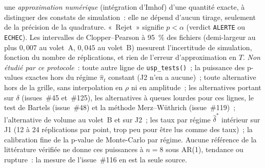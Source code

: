 \documentclass[a4paper,11pt]{article}
\newcommand{\code}[1]{\texttt{\small #1}}
\begin{document}
une \emph{approximation numérique} (intégration d'Imhof) d'une quantité exacte, à distinguer des
constats de simulation~: elle ne dépend d'aucun tirage, seulement de la précision de la
quadrature. «~Rejet~» signifie $p < \alpha$ (verdict \code{ALERTE} ou \code{ECHEC}). Les
intervalles de Clopper--Pearson à 95~\% des fichiers (demi-largeur au plus $0{,}007$ au volet~A,
$0{,}045$ au volet~B) mesurent l'incertitude de simulation, fonction du nombre de réplications, et
rien de l'erreur d'approximation en $T$. \emph{Non étudié par ce protocole}~: toute autre ligne de \code{usp\_tests()}~; la
puissance des p-values exactes hors du régime $\hat\pi_t$ constant (J2 n'en a aucune)~; toute
alternative hors de la grille, sans interpolation en $\rho$ ni en amplitude~; les alternatives
portant sur $\delta$ (issues~\#45 et~\#125), les alternatives à queues lourdes pour ces
lignes, le test de Bartels (issue~\#48) et la méthode Merz--Wüthrich (issue~\#119)~;
l'alternative de volume au volet~B et sur J2~; les taux par régime $\hat\delta^*$ intérieur sur J1
(12 à 24 réplications par point, trop peu pour être lus comme des taux)~; la calibration fine de
la p-value de Monte-Carlo par régime. Aucune référence de la littérature vérifiée ne donne ces
puissances à $n = 8$ sous AR(1), tendance ou rupture~: la mesure de l'issue~\#116 en est la seule
source.
\end{document}
